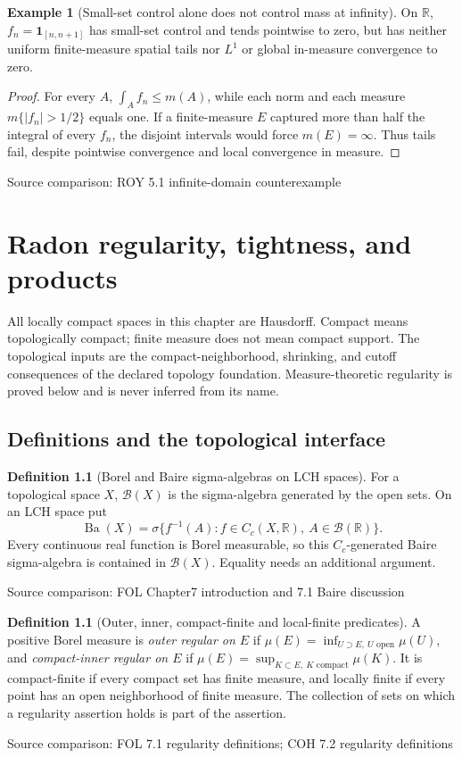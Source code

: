 \documentclass[11pt,oneside,openany]{book}
\theoremstyle{definition}
\newtheorem{definition}[theorem]{Definition}
\newtheorem{example}[theorem]{Example}
\theoremstyle{remark}
\newcounter{foundation}\renewcommand{\thefoundation}{F\arabic{foundation}}
\newcommand{\R}{\mathbb R}\newcommand{\C}{\mathbb C}
\newcommand{\BB}{\mathcal B}\newcommand{\SSS}{\mathcal S}
\newcommand{\one}{\mathbf1}\newcommand{\ind}[1]{\mathbf1_{#1}}
\newcommand{\family}[1]{}
\newcommand{\source}[1]{\par\begingroup\small\sffamily\color{black!65}Source comparison: #1\par\endgroup}
\begin{document}
\begin{example}[Small-set control alone does not control mass at infinity]\family{D11.17.escaping_mass_counterexample}\label{d11:17:escaping-mass-counterexample}
On $\R$, $f_n=\one_{[n,n+1]}$ has small-set control and tends pointwise to zero, but has neither uniform finite-measure spatial tails nor $L^1$ or global in-measure convergence to zero.
\end{example}
\begin{proof}
For every $A$, $\int_Af_n\le m(A)$, while each norm and each measure $m\{|f_n|>1/2\}$ equals one. If a finite-measure $E$ captured more than half the integral of every $f_n$, the disjoint intervals would force $m(E)=\infty$. Thus tails fail, despite pointwise convergence and local convergence in measure.
\end{proof}
\source{ROY 5.1 infinite-domain counterexample}



\chapter{Radon regularity, tightness, and products}\label{ch:d11-18}

All locally compact spaces in this chapter are Hausdorff. Compact means topologically compact; finite measure does not mean compact support. The topological inputs are the compact-neighborhood, shrinking, and cutoff consequences of the declared topology foundation. Measure-theoretic regularity is proved below and is never inferred from its name.

\section{Definitions and the topological interface}

\begin{definition}[Borel and Baire sigma-algebras on LCH spaces]\family{D11.18.borel_baire}\label{d11:18:borel-baire}
For a topological space $X$, $\BB(X)$ is the sigma-algebra generated by the open sets. On an LCH space put
\[\operatorname{Ba}(X)=\sigma\{f^{-1}(A):f\in C_c(X,\R),\ A\in\BB(\R)\}.\]
Every continuous real function is Borel measurable, so this $C_c$-generated Baire sigma-algebra is contained in $\BB(X)$. Equality needs an additional argument.
\end{definition}
\source{FOL Chapter7 introduction and 7.1 Baire discussion}

\begin{definition}[Outer, inner, compact-finite and local-finite predicates]\family{D11.18.regularity_predicates}\label{d11:18:regularity-predicates}
A positive Borel measure is \emph{outer regular on $E$} if
$\mu(E)=\inf_{U\supset E,\ U\text{ open}}\mu(U)$, and \emph{compact-inner regular on $E$} if
$\mu(E)=\sup_{K\subset E,\ K\text{ compact}}\mu(K)$.
It is compact-finite if every compact set has finite measure, and locally finite if every point has an open neighborhood of finite measure. The collection of sets on which a regularity assertion holds is part of the assertion.
\end{definition}
\source{FOL 7.1 regularity definitions; COH 7.2 regularity definitions}
\end{document}
